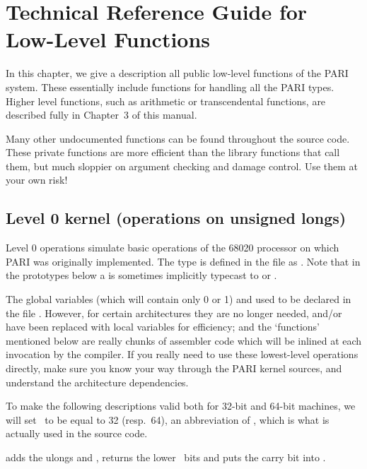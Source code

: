 %
%
\chapter{Technical Reference Guide for Low-Level Functions}

In this chapter, we give a description all public low-level functions of the
PARI system. These essentially include functions for handling all the PARI
types. Higher level functions, such as arithmetic or transcendental
functions, are described fully in Chapter~3 of this manual.

Many other undocumented functions can be found throughout the source code.
These private functions are more efficient than the library functions that
call them, but much sloppier on argument checking and damage control. Use
them at your own risk!

\section{Level 0 kernel (operations on unsigned longs)}

\noindent
Level 0 operations simulate basic operations of the 68020 processor on which
PARI was originally implemented. The type  is defined in the file
 as . Note that in the prototypes below a
 is sometimes implicitly typecast to  or .

The global  variables  (which will contain
only 0 or 1) and  used to be declared in the file
. However, for certain architectures they are no longer
needed, and/or have been replaced with local variables for efficiency;
and the `functions' mentioned below are really chunks of assembler code which
will be inlined at each invocation by the compiler. If you really need to
use these lowest-level operations directly, make sure you know your way
through the PARI kernel sources, and understand the architecture dependencies.

To make the following descriptions valid both for 32-bit and 64-bit
machines, we will set \B\ to be equal to 32 (resp.~64), an abbreviation of
, which is what is actually used in the source code.

 adds the ulongs  and ,
returns the lower \B\ bits and puts the carry bit into .

